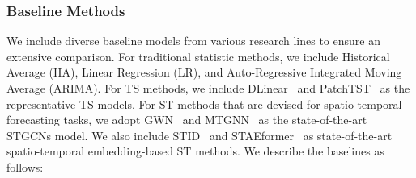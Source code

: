 \subsubsection{Baseline Methods} We include diverse baseline models from various research lines to ensure an extensive comparison. For traditional statistic methods, we include Historical Average (HA), Linear Regression (LR), and Auto-Regressive Integrated Moving Average (ARIMA). For TS methods, we include DLinear~\cite{zeng2023transformers} and PatchTST~\cite{nie2022time} as the representative TS models. For ST methods that are devised for spatio-temporal forecasting tasks, we adopt GWN~\cite{wu2019graph} and MTGNN~\cite{wu2020connecting} as the state-of-the-art STGCNs model. We also include STID~\cite{shao2022spatial} and STAEformer~\cite{liu2023spatio} as state-of-the-art spatio-temporal embedding-based ST methods. We describe the baselines as follows:
